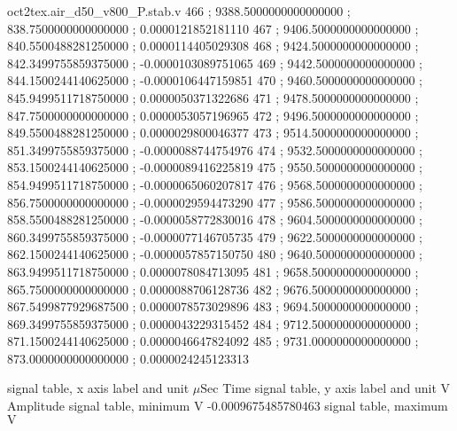 \begin{filecontents}[overwrite]{oct2tex.air_d50_v800_P.stab.v}
466 ; 9388.5000000000000000 ; 838.7500000000000000 ; 0.0000121852181110
467 ; 9406.5000000000000000 ; 840.5500488281250000 ; 0.0000114405029308
468 ; 9424.5000000000000000 ; 842.3499755859375000 ; -0.0000103089751065
469 ; 9442.5000000000000000 ; 844.1500244140625000 ; -0.0000106447159851
470 ; 9460.5000000000000000 ; 845.9499511718750000 ; 0.0000050371322686
471 ; 9478.5000000000000000 ; 847.7500000000000000 ; 0.0000053057196965
472 ; 9496.5000000000000000 ; 849.5500488281250000 ; 0.0000029800046377
473 ; 9514.5000000000000000 ; 851.3499755859375000 ; -0.0000088744754976
474 ; 9532.5000000000000000 ; 853.1500244140625000 ; -0.0000089416225819
475 ; 9550.5000000000000000 ; 854.9499511718750000 ; -0.0000065060207817
476 ; 9568.5000000000000000 ; 856.7500000000000000 ; -0.0000029594473290
477 ; 9586.5000000000000000 ; 858.5500488281250000 ; -0.0000058772830016
478 ; 9604.5000000000000000 ; 860.3499755859375000 ; -0.0000077146705735
479 ; 9622.5000000000000000 ; 862.1500244140625000 ; -0.0000057857150750
480 ; 9640.5000000000000000 ; 863.9499511718750000 ; 0.0000078084713095
481 ; 9658.5000000000000000 ; 865.7500000000000000 ; 0.0000088706128736
482 ; 9676.5000000000000000 ; 867.5499877929687500 ; 0.0000078573029896
483 ; 9694.5000000000000000 ; 869.3499755859375000 ; 0.0000043229315452
484 ; 9712.5000000000000000 ; 871.1500244140625000 ; 0.0000046647824092
485 ; 9731.0000000000000000 ; 873.0000000000000000 ; 0.0000024245123313
\end{filecontents}
\expandafter\def\csname oct2tex.air_d50_v800_P.stabxlbl.d\endcsname{signal table, x axis label and unit}
\expandafter\def\csname oct2tex.air_d50_v800_P.stabxlbl.u\endcsname{\ensuremath{\mu\text{Sec}}}
\expandafter\def\csname oct2tex.air_d50_v800_P.stabxlbl.v\endcsname{Time}
\expandafter\def\csname oct2tex.air_d50_v800_P.stabylbl.d\endcsname{signal table, y axis label and unit}
\expandafter\def\csname oct2tex.air_d50_v800_P.stabylbl.u\endcsname{\ensuremath{\text{V}}}
\expandafter\def\csname oct2tex.air_d50_v800_P.stabylbl.v\endcsname{Amplitude}
\expandafter\def\csname oct2tex.air_d50_v800_P.stabmin.d\endcsname{signal table, minimum}
\expandafter\def\csname oct2tex.air_d50_v800_P.stabmin.u\endcsname{\ensuremath{\text{V}}}
\expandafter\def\csname oct2tex.air_d50_v800_P.stabmin.v\endcsname{-0.0009675485780463}
\expandafter\def\csname oct2tex.air_d50_v800_P.stabmax.d\endcsname{signal table, maximum}
\expandafter\def\csname oct2tex.air_d50_v800_P.stabmax.u\endcsname{\ensuremath{\text{V}}}
